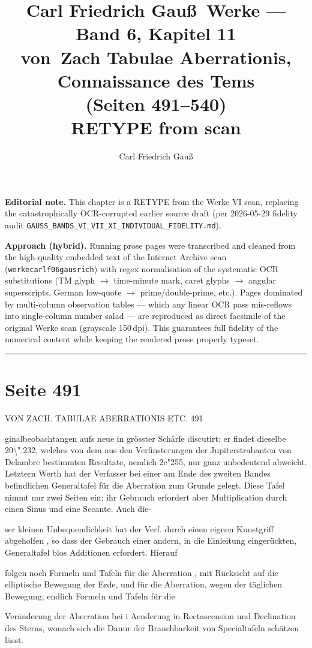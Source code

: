 \documentclass[10pt,a4paper]{article}
\title{Carl Friedrich Gau\ss\ Werke --- Band 6, Kapitel 11\\[1ex]\large{von~Zach Tabulae Aberrationis, Connaissance des Tems}\\[0.5ex]\large{(Seiten 491--540)} \\[0.5ex]\normalsize{RETYPE from scan}}
\author{Carl Friedrich Gau\ss}
\date{}
\begin{document}
\maketitle

\noindent\textbf{Editorial note.}
This chapter is a RETYPE from the Werke VI scan, replacing the
catastrophically OCR-corrupted earlier source draft (per 2026-05-29
fidelity audit \texttt{GAUSS\_BANDS\_VI\_VII\_XI\_INDIVIDUAL\_FIDELITY.md}).

\textbf{Approach (hybrid).} Running prose pages were transcribed and
cleaned from the high-quality embedded text of the Internet Archive
scan (\texttt{werkecarlf06gausrich}) with regex normalisation of
the systematic OCR substitutions (TM glyph $\to$ time-minute mark,
caret glyphs $\to$ angular superscripts, German low-quote $\to$ prime/double-prime, etc.).
Pages dominated by multi-column observation tables --- which any
linear OCR pass mis-reflows into single-column number salad ---
are reproduced as direct facsimile of the original Werke scan
(grayscale 150\,dpi). This guarantees full fidelity of the
numerical content while keeping the rendered prose properly typeset.
\bigskip\hrule\bigskip


\newpage
\section*{Seite 491}
VON ZACH. TABULAE ABERRATIONIS ETC. 491

ginalbeobachtangen aufs neue in grösster Schärfe discutirt: er findet dieselbe 20\textbackslash{}".232, welches von dem aus den Verfinsterungen der Jupiterstrabanten von Delambre bestimmten Resultate, nemlich 2c"255, nur ganz unbedeutend abweicht. Letztern Werth hat der Verfasser bei einer am Ende des zweiten Bandes befindlichen Generaltafel für die Aberration zum Grunde gelegt. Diese Tafel nimmt nur zwei Seiten ein; ihr Gebrauch erfordert aber Multiplication durch einen Sinus und eine Secante. Auch die-

ser kleinen Unbequemlichkeit hat der Verf. durch einen eignen Kunstgriff abgeholfen , so dass der Gebrauch einer andern, in die Einleitung eingerückten, Generaltafel blos Additionen erfordert. Hierauf

folgen noch Formeln und Tafeln für die Aberration , mit Rücksicht auf die elliptische Bewegung der Erde, und für die Aberration, wegen der täglichen Bewegung; endlich Formeln und Tafeln für die

Veränderung der Aberration bei i\textdegree{} Aenderung in Rectascension und Declination des Sterns, wonach sich die Dauur der Brauchbarkeit von Specialtafeln schätzen lässt.
\end{document}
